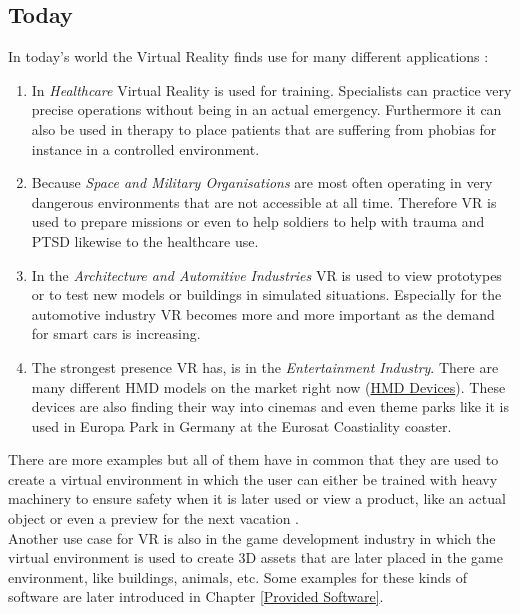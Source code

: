 \documentclass{report}
\begin{document}
		\subsection{Today}
		\startsubsection
			In today's world the Virtual Reality finds use for many different applications \cite{Boa12}:
			\begin{enumerate}
				\item In \textit{Healthcare} Virtual Reality is used for training. Specialists can practice very precise operations without being in an actual emergency. Furthermore it can also be used in therapy to place patients that are suffering from phobias for instance in a controlled environment.
				\item Because \textit{Space and Military Organisations} are most often operating in very dangerous environments that are not accessible at all time. Therefore VR is used to prepare missions or even to help soldiers to help with trauma and PTSD likewise to the healthcare use.
				\item In the \textit{Architecture and Automitive Industries} VR is used to view prototypes or to test new models or buildings in simulated situations. Especially for the automotive industry VR becomes more and more important as the demand for smart cars is increasing.
				\item The strongest presence VR has, is in the \textit{Entertainment Industry}. There are many different HMD models on the market right now (\href{https://www.vrs.org.uk/the-ultimate-guide-to-virtual-reality-headsets/}{HMD Devices}). These devices are also finding their way into cinemas and even theme parks like it is used in Europa Park in Germany at the Eurosat Coastiality coaster.
			\end{enumerate}
			There are more examples but all of them have in common that they are used to create a virtual environment in which the user can either be trained with heavy machinery to ensure safety when it is later used or view a product, like an actual object or even a preview for the next vacation \cite{VRUseCases}. \\
			Another use case for VR is also in the game development industry in which the virtual environment is used to create 3D assets that are later placed in the game environment, like buildings, animals, etc. Some examples for these kinds of software are later introduced in Chapter \ref{Provided Software}.
		\closesection
\end{document}
